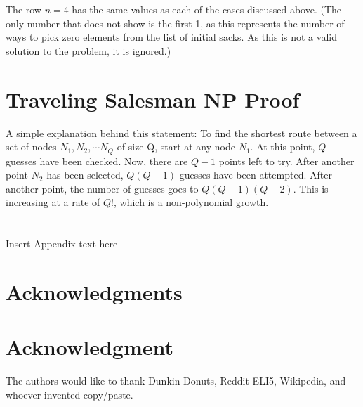 \documentclass[10pt,journal,compsoc]{IEEEtran}
\begin{document}
\begin{itemize}
	The row $n=4$ has the same values as each of the cases discussed above. (The only number that does not show is the first 1, as this represents the number of ways to pick zero elements from the list of initial sacks. As this is not a valid solution to the problem, it is ignored.)
\end{itemize}

\section{Traveling Salesman NP Proof}
A simple explanation behind this statement: To find the shortest route between a set of nodes $N_1,N_2,\cdots N_Q$ of size Q, start at any node $N_1$. At this point, $Q$ guesses have been checked. Now, there are $Q-1$ points left to try. After another point $N_2$ has been selected, $Q(Q-1)$ guesses have been attempted. After another point, the number of guesses goes to $Q(Q-1)(Q-2)$. This is increasing at a rate of $Q!$, which is a non-polynomial growth.

\section{}
Insert Appendix text here
\ifCLASSOPTIONcompsoc
  \section*{Acknowledgments}
\else
  \section*{Acknowledgment}
\fi


The authors would like to thank Dunkin Donuts, Reddit ELI5, Wikipedia, and whoever invented copy/paste. 


\ifCLASSOPTIONcaptionsoff
  \newpage
\fi



\end{document}
